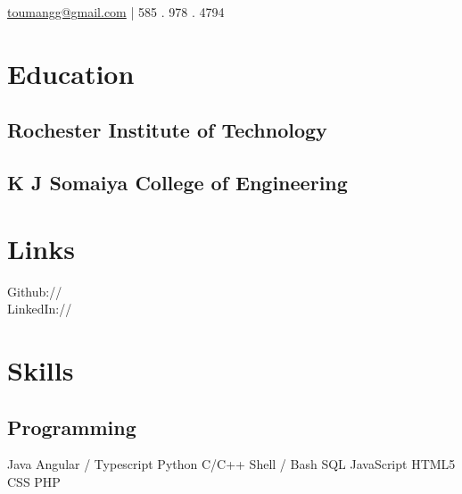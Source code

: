 \documentclass[]{main}
\begin{document}
\lastupdated

{\href{mailto:me@galaumang.com}{toumangg@gmail.com}  |  585 . 978 . 4794  %
}


\begin{minipage}[t]{0.25\textwidth} 

\section{Education} 
\subsection{Rochester Institute of Technology}
\sectionsep
{}
\sectionsep\sectionsep

\subsection{K J Somaiya College of Engineering}
\sectionsep
{}
\sectionsep\sectionsep


\section{Links} 
Github:// \href{https://github.com/galaumang}{} \\
LinkedIn://  \href{https://www.linkedin.com/in/galaumang}{} \\
\sectionsep\sectionsep

\section{Skills}
\subsection{Programming}\sectionsep
                    Java  
    \textbullet{}   Angular / Typescript  
    \textbullet{}   Python  
    \textbullet{}   C/C++ 
    \textbullet{}   Shell / Bash  
    \textbullet{}   SQL
    \textbullet{}   JavaScript  
    \textbullet{}   HTML5  
    \textbullet{}   CSS  
    \textbullet{}   PHP
\sectionsep\sectionsep

\end{minipage}
\end{document}
